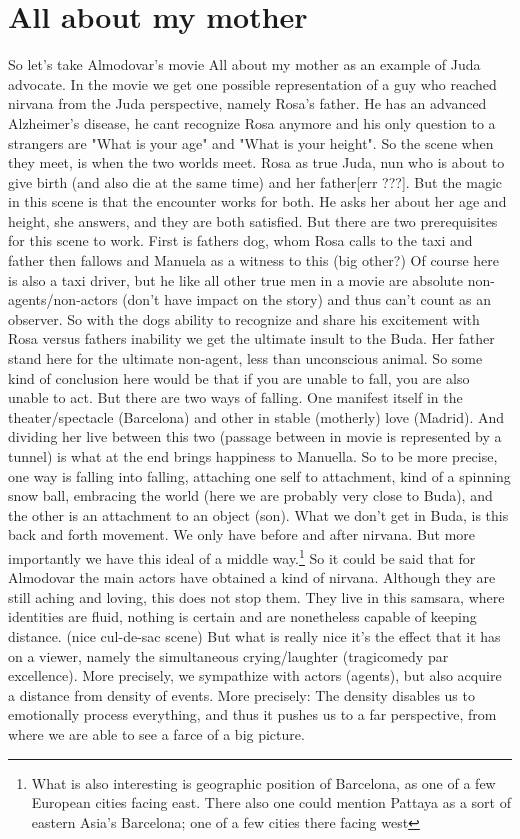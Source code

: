 \documentclass[10pt]{book}
\begin{document}
\section{All about my mother}
So let's take Almodovar's movie All about my mother as an example of Juda advocate. In the movie we get one possible representation of a guy who reached nirvana from the Juda perspective, namely Rosa's father. He has an advanced Alzheimer's disease, he cant recognize Rosa anymore and his only question to a strangers are "What is your age" and "What is your height". So the scene when they meet, is when the two worlds meet. Rosa as true Juda, nun who is about to give birth (and also die at the same time) and her father[err ???]. But the magic in this scene is that the encounter works for both. He asks her about her age and height, she answers, and they are both satisfied. But there are two prerequisites for this scene to work. First is fathers dog, whom Rosa calls to the taxi and father then fallows and Manuela as a witness to this (big other?) Of course here is also a taxi driver, but he like all other true men in a movie are absolute non-agents/non-actors (don't have impact on the story) and thus can't count as an observer. So with the dogs ability to recognize and share his excitement with Rosa versus fathers inability we get the ultimate insult to the Buda. Her father stand here for the ultimate non-agent, less than unconscious animal. 
So some kind of conclusion here would be that if you are unable to fall, you are also unable to act. But there are two ways of falling. One manifest itself in the theater/spectacle (Barcelona) and other in stable (motherly) love (Madrid). And dividing her live between this two (passage between in movie is represented by a tunnel) is what at the end brings happiness to Manuella. So to be more precise, one way is falling into falling, attaching one self to attachment, kind of a spinning snow ball, embracing the world (here we are probably very close to Buda), and the other is an attachment to an object (son). What we don't get in Buda, is this back and forth movement. We only have before and after nirvana. But more importantly we have this ideal of a middle way.\footnote{What is also interesting is geographic position of Barcelona, as one of a few European cities facing east. There also one could mention Pattaya as a sort of eastern Asia's Barcelona; one of a few cities there facing west}
So it could be said that for Almodovar the main actors have obtained a kind of nirvana. Although they are still aching and loving, this does not stop them. They live in this samsara, where identities are fluid, nothing is certain and are nonetheless capable of keeping distance. (nice cul-de-sac scene) But what is really nice it's the effect that it has on a viewer, namely the simultaneous crying/laughter (tragicomedy par excellence). More precisely, we sympathize with actors (agents), but also acquire a distance from density of events. More precisely: The density disables us to emotionally process everything, and thus it pushes us to a far perspective, from where we are able to see a farce of a big picture.
\end{document}
